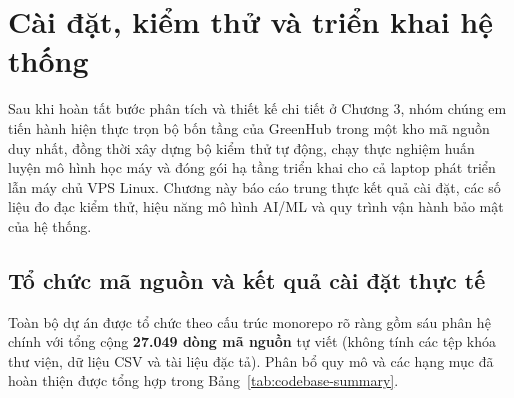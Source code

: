 \chapter{Cài đặt, kiểm thử và triển khai hệ thống}
\label{chap:implementation-testing-deployment}

Sau khi hoàn tất bước phân tích và thiết kế chi tiết ở Chương 3, nhóm chúng em tiến hành hiện thực trọn bộ bốn tầng của GreenHub trong một kho mã nguồn duy nhất, đồng thời xây dựng bộ kiểm thử tự động, chạy thực nghiệm huấn luyện mô hình học máy và đóng gói hạ tầng triển khai cho cả laptop phát triển lẫn máy chủ VPS Linux. Chương này báo cáo trung thực kết quả cài đặt, các số liệu đo đạc kiểm thử, hiệu năng mô hình AI/ML và quy trình vận hành bảo mật của hệ thống.

\section{Tổ chức mã nguồn và kết quả cài đặt thực tế}
\label{sec:c4-implementation}

Toàn bộ dự án được tổ chức theo cấu trúc monorepo rõ ràng gồm sáu phân hệ chính với tổng cộng \textbf{27.049 dòng mã nguồn} tự viết (không tính các tệp khóa thư viện, dữ liệu CSV và tài liệu đặc tả). Phân bổ quy mô và các hạng mục đã hoàn thiện được tổng hợp trong Bảng~\ref{tab:codebase-summary}.

